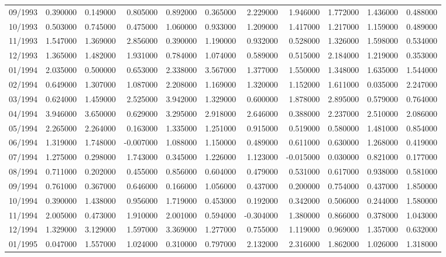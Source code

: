 \begin{tabular}{lrrrrrrrrrr}
09/1993 & 0.390000 & 0.149000 & 0.805000 & 0.892000 & 0.365000 & 2.229000 & 1.946000 & 1.772000 & 1.436000 & 0.488000 \\
10/1993 & 0.503000 & 0.745000 & 0.475000 & 1.060000 & 0.933000 & 1.209000 & 1.417000 & 1.217000 & 1.159000 & 0.489000 \\
11/1993 & 1.547000 & 1.369000 & 2.856000 & 0.390000 & 1.190000 & 0.932000 & 0.528000 & 1.326000 & 1.598000 & 0.534000 \\
12/1993 & 1.365000 & 1.482000 & 1.931000 & 0.784000 & 1.074000 & 0.589000 & 0.515000 & 2.184000 & 1.219000 & 0.353000 \\
01/1994 & 2.035000 & 0.500000 & 0.653000 & 2.338000 & 3.567000 & 1.377000 & 1.550000 & 1.348000 & 1.635000 & 1.544000 \\
02/1994 & 0.649000 & 1.307000 & 1.087000 & 2.208000 & 1.169000 & 1.320000 & 1.152000 & 1.611000 & 0.035000 & 2.247000 \\
03/1994 & 0.624000 & 1.459000 & 2.525000 & 3.942000 & 1.329000 & 0.600000 & 1.878000 & 2.895000 & 0.579000 & 0.764000 \\
04/1994 & 3.946000 & 3.650000 & 0.629000 & 3.295000 & 2.918000 & 2.646000 & 0.388000 & 2.237000 & 2.510000 & 2.086000 \\
05/1994 & 2.265000 & 2.264000 & 0.163000 & 1.335000 & 1.251000 & 0.915000 & 0.519000 & 0.580000 & 1.481000 & 0.854000 \\
06/1994 & 1.319000 & 1.748000 & -0.007000 & 1.088000 & 1.150000 & 0.489000 & 0.611000 & 0.630000 & 1.268000 & 0.419000 \\
07/1994 & 1.275000 & 0.298000 & 1.743000 & 0.345000 & 1.226000 & 1.123000 & -0.015000 & 0.030000 & 0.821000 & 0.177000 \\
08/1994 & 0.711000 & 0.202000 & 0.455000 & 0.856000 & 0.604000 & 0.479000 & 0.531000 & 0.617000 & 0.938000 & 0.581000 \\
09/1994 & 0.761000 & 0.367000 & 0.646000 & 0.166000 & 1.056000 & 0.437000 & 0.200000 & 0.754000 & 0.437000 & 1.850000 \\
10/1994 & 0.390000 & 1.438000 & 0.956000 & 1.719000 & 0.453000 & 0.192000 & 0.342000 & 0.506000 & 0.244000 & 1.580000 \\
11/1994 & 2.005000 & 0.473000 & 1.910000 & 2.001000 & 0.594000 & -0.304000 & 1.380000 & 0.866000 & 0.378000 & 1.043000 \\
12/1994 & 1.329000 & 3.129000 & 1.597000 & 3.369000 & 1.277000 & 0.755000 & 1.119000 & 0.969000 & 1.357000 & 0.632000 \\
01/1995 & 0.047000 & 1.557000 & 1.024000 & 0.310000 & 0.797000 & 2.132000 & 2.316000 & 1.862000 & 1.026000 & 1.318000 \\

\end{tabular}
